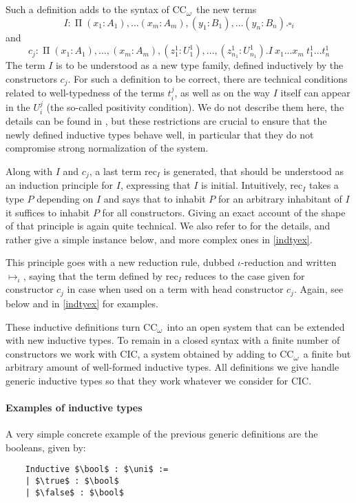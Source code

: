 \documentclass{kaobook}
\renewcommand{\mathtt}{\mathrm}
\newcommand{\uni}[1][]{\square_{#1}}
\newcommand{\red}{\mapsto}
\newcommand{\ired}{\red_\iota}
\renewcommand{\P}{\operatorname{\Pi}}
\DeclareMathOperator{\?}{?}
\newcommand{\rec}{\mathtt{rec}}
\newcommand{\bool}{\mathbf{B}}
\newcommand{\true}{\mathtt{true}}
\newcommand{\false}{\mathtt{false}}
\newcommand{\coc}{CC\textsubscript{$\omega$}}
\begin{document}
{Such a definition adds to the syntax of \coc\ the new terms
\[I :  \P (x_1 : A_1),\dots (x_m : A_m),(y_1 : B_1),\dots (y_n : B_n) . \uni[i]\]
and
\[c_j :  \P (x_1 : A_1), \dots, (x_m : A_m), (z_1^1 : U_1^1), \dots, (z_{n_1}^1 : U_{n_1}^1) . I~x_1\dots x_m~t_1^1\dots t_n^1\]
The term $I$ is to be understood as a new type family, defined inductively by the constructors $c_j$. For such a definition to be correct, there are technical conditions related to well-typedness of the terms $t_i^j$, as well as on the way $I$ itself can appear in the $U_i^j$ (the so-called positivity condition). We do not describe them here, the details can be found in \cite{Paulin-Mohring1993}, but these restrictions are crucial to ensure that the newly defined inductive types behave well, in particular that they do not compromise strong normalization of the system.

Along with $I$ and $c_j$, a last term $\rec_I$ is generated, that should be understood as an induction principle for $I$, expressing that $I$ is initial. Intuitively, $\rec_I$ takes a type $P$ depending on $I$ and says that to inhabit $P$ for an arbitrary inhabitant of $I$ it suffices to inhabit $P$ for all constructors.  Giving an exact account of the shape of that principle is again quite technical. We also refer to \cite{Paulin-Mohring1993} for the details, and rather give a simple instance below, and more complex ones in \autoref{indtyex}.

This principle goes with a new reduction rule, dubbed $\iota$-reduction and written $\ired$, saying that the term defined by $\rec_I$ reduces to the case given for constructor $c_j$ in case when used on a term with head constructor $c_j$. Again, see below and in \autoref{indtyex} for examples.

These inductive definitions turn \coc\ into an open system that can be extended with new inductive types. To remain in a closed syntax with a finite number of constructors we work with CIC, a system obtained by adding to \coc\ a finite but arbitrary amount of well-formed inductive types. All definitions we give handle generic inductive types so that they work whatever we consider for CIC.

\paragraph{Examples of inductive types}

A very simple concrete example of the previous generic definitions are the booleans, given by:
	\begin{lstlisting}
	Inductive $\bool$ : $\uni$ :=
	| $\true$ : $\bool$
	| $\false$ : $\bool$
	\end{lstlisting}

}
\end{document}
